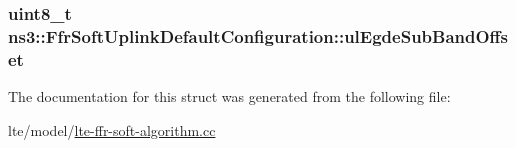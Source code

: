 \subsubsection[{\texorpdfstring{ul\+Egde\+Sub\+Band\+Offset}{ulEgdeSubBandOffset}}]{\setlength{\rightskip}{0pt plus 5cm}uint8\+\_\+t ns3\+::\+Ffr\+Soft\+Uplink\+Default\+Configuration\+::ul\+Egde\+Sub\+Band\+Offset}\hypertarget{structns3_1_1FfrSoftUplinkDefaultConfiguration_a7dbcc1395c87f04ab3b9eee58ec80674}{}\label{structns3_1_1FfrSoftUplinkDefaultConfiguration_a7dbcc1395c87f04ab3b9eee58ec80674}


The documentation for this struct was generated from the following file\+:\begin{DoxyCompactItemize}
\item 
lte/model/\hyperlink{lte-ffr-soft-algorithm_8cc}{lte-\/ffr-\/soft-\/algorithm.\+cc}\end{DoxyCompactItemize}
